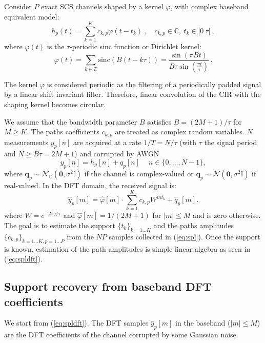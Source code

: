 \documentclass[journal,10pt]{IEEEtran}
\providecommand{\Cspace}{\mathbb{C}}
\providecommand{\vct}[1]{\boldsymbol{#1}}
\begin{document}
Consider $P$ exact SCS channels shaped by a kernel $\varphi$, with complex baseband equivalent model:
\begin{equation}\label{eq:mpchannelth}
 h_p(t)=\sum_{k=1}^K c_{k,p}\varphi(t-t_k)\ ,\quad c_{k,p}\in\Cspace,\ t_k\in [0\ \tau[\ ,
\end{equation}
where $\varphi(t)$ is the $\tau$-periodic sinc function or Dirichlet kernel:
\begin{equation}
\label{chap2equ:DirichletKernel}
  \varphi(t) = \sum_{k \in \mathbb{Z}} \text{sinc}(B(t-k\tau)) = \frac{\sin(\pi B t)}{B\tau \sin(\frac{\pi t}{\tau})}\,.
\end{equation}

The kernel $\varphi$ is considered periodic as the filtering of a periodically padded signal by a linear shift invariant filter. Therefore, linear convolution of the CIR with the shaping kernel becomes circular.  

We assume that the bandwidth parameter $B$ satisfies $B = (2M+1)/\tau$ for $M \geq K$. The paths coefficients $c_{k,p}$ are treated as complex random variables. $N$ measurements $y_p[n]$ are acquired at a rate $1/T=N/\tau$ (with $\tau$ the signal period and $N\geq B\tau=2M+1$) and corrupted by AWGN
\begin{equation}y_p[n]=h_p[n]+q_p[n]\ \quad n\in\lbrace 0,\dots,N-1\rbrace , \label{eq:spl}\end{equation}
 where $\vct q_p \sim\mathcal N_\Cspace(\vct 0,\sigma^2\mathbb I)$ if the channel is complex-valued or $\vct q_p \sim\mathcal N(\vct 0,\sigma^2\mathbb I)$ if real-valued.
In the DFT domain, the received signal is:
\begin{equation}\widehat{y}_p[m]=\widehat{\varphi}[m]\cdot\sum_{k=1}^K c_{k,p}W^{mt_k}+\widehat{q}_p[m].\label{eq:spldft}\end{equation}
where $W=e^{-2\pi j /\tau}$ and $\widehat{\varphi}[m] = 1/(2M+1) $ for $|m| \leq M$ and is zero otherwise. The goal is to estimate the support $\lbrace t_k\rbrace_{k=1\dots K}$ and the paths amplitudes $\lbrace c_{k,p}\rbrace_{k=1\dots K,p=1\dots P}$ from the $NP$ samples collected in (\ref{eq:spl}). Once the support is known, estimation of the path amplitudes is simple linear algebra as seen in (\ref{eq:spldft}).

\subsection{Support recovery from baseband DFT coefficients}We start from (\ref{eq:spldft}). The DFT samples $\widehat{y}_p[m]$ in the baseband ($|m|\leq M$) are the DFT coefficients of the channel corrupted by some Gaussian noise.
\end{document}
